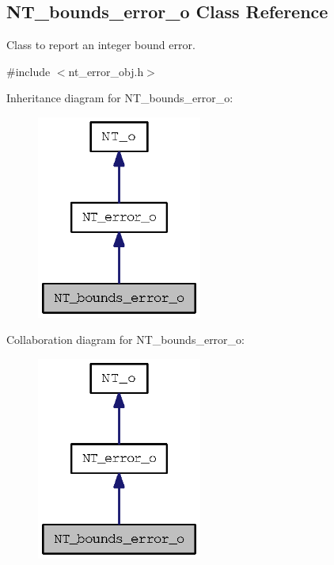 \subsection{NT\_\-bounds\_\-error\_\-o Class Reference}
\label{class_n_t__bounds__error__o}


Class to report an integer bound error.  




{\ttfamily \#include $<$nt\_\-error\_\-obj.h$>$}



Inheritance diagram for NT\_\-bounds\_\-error\_\-o:
\nopagebreak
\begin{figure}[H]
\begin{center}
\leavevmode
\includegraphics[width=154pt]{class_n_t__bounds__error__o__inherit__graph}
\end{center}
\end{figure}


Collaboration diagram for NT\_\-bounds\_\-error\_\-o:
\nopagebreak
\begin{figure}[H]
\begin{center}
\leavevmode
\includegraphics[width=154pt]{class_n_t__bounds__error__o__coll__graph}
\end{center}
\end{figure}

